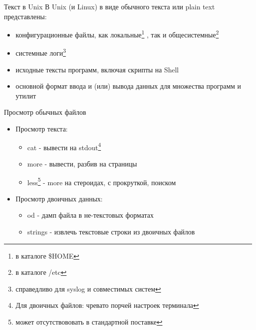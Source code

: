 \begin{frame}{Текст в Unix}
  В Unix (и Linux) в виде обычного текста или \alert{plain text} представлены:\pause
  \begin{itemize}
    \item \alert{конфигурационные файлы}, как локальные\footnote{в каталоге \$HOME} , так и общесистемные\footnote{в каталоге /etc} \pause
    \item \alert{системные логи}\footnote{справедливо для \alert{syslog} и совместимых систем}
    \item \alert{исходные тексты программ}, включая скрипты на Shell
    \item \alert{основной формат ввода и (или) вывода данных} для множества программ и утилит
  \end{itemize} 

\end{frame}


\begin{frame}{Просмотр обычных файлов}
  \begin{itemize}
    \item Просмотр текста:
      \begin{itemize} 
        \item \alert{cat} - вывести на stdout\footnote{Для двоичных файлов: чревато порчей настроек терминала} \pause
        \item \alert{more} - вывести, разбив на страницы
        \item \alert{less}\footnote{может отсутствововать в стандартной поставке} - \alert{more} на стероидах, с прокруткой, поиском
      \end{itemize} \pause
    \item Просмотр двоичных данных:
      \begin{itemize} 
        \item \alert{od} - дамп файла в не-текстовых форматах

        \item \alert{strings} - извлечь текстовые строки из двоичных файлов
      \end{itemize}
  \end{itemize}

\end{frame}


